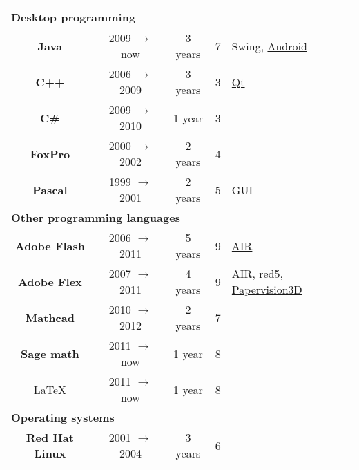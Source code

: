 \documentclass[utf8x,helvetica,narrow,english,logo,totpages]{europecv}
\begin{document}
\begin{europecv}
{\begin{tabular}{ | c | c | c | c | >{\centering\arraybackslash}p{2.282cm} |}
    \multicolumn{5}{|l|}{\textbf{Desktop programming}} \\ \hline

    \textbf{Java}
    		& 2009 $\to$ now
    		& 3 years
    		& 7
    		& Swing, \href{http://developer.android.com}{Android}
	\\ \hline

    \textbf{C++}
    		& 2006 $\to$ 2009
    		& 3 years
    		& 3
    		& \href{http://qt.nokia.com/products/}{Qt}
	\\ \hline

    \textbf{C\#}
    		& 2009 $\to$ 2010
    		& 1 year
    		& 3
    		& 
	\\ \hline

    \textbf{FoxPro}
    		& 2000 $\to$ 2002
    		& 2 years
    		& 4
    		& 
	\\ \hline

    \textbf{Pascal}
    		& 1999 $\to$ 2001
    		& 2 years
    		& 5
    		& GUI
	\\ \hline\hline


    \multicolumn{5}{|l|}{\textbf{Other programming languages}} \\ \hline

    \textbf{Adobe Flash}
    		& 2006 $\to$ 2011
    		& 5 years
    		& 9
    		& \href{http://www.adobe.com/products/air.html}{AIR}
	\\ \hline

    \textbf{Adobe Flex}
    		& 2007 $\to$ 2011
    		& 4 years
    		& 9
    		& \href{http://www.adobe.com/products/air.html}{AIR}, \href{http://www.red5.org/}{red5}, \href{http://blog.papervision3d.org/}{Papervision3D}
	\\ \hline

    \textbf{Mathcad}
    		& 2010 $\to$ 2012
    		& 2 years
    		& 7
    		& 
	\\ \hline

    \textbf{Sage math}
    		& 2011 $\to$ now
    		& 1 year
    		& 8
    		& 
	\\ \hline

    \LaTeX{}
    		& 2011 $\to$ now
    		& 1 year
    		& 8
    		& 
	\\ \hline \hline


    \multicolumn{5}{|l|}{\textbf{Operating systems}} \\ \hline

    \textbf{\hspace{-0.20cm} Red Hat Linux \hspace{-0.20cm}}
    		& 2001 $\to$ 2004
    		& 3 years
    		& 6
    		& 
	\\ \hline


\end{tabular}}
\end{europecv}
\end{document}
